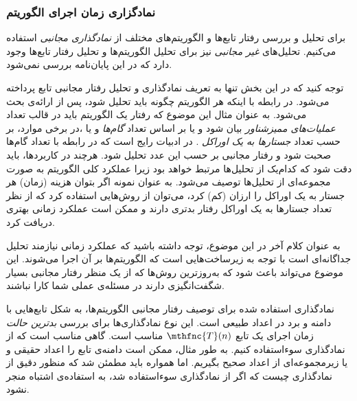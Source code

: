 
% 
%
%
%
%
%
%
%
%
%
%
%

\subsubsection{
نمادگزاری زمان اجرای الگوریتم
\cite{clrs2009}
}
برای تحلیل و بررسی رفتار تابع‌ها و الگوریتم‌های مختلف از
\textit{
نمادگذاری مجانبی
} 
استفاده می‌کنیم. تحلیل‌های 
\textit{
غیر مجانبی
} 
نیز برای تحلیل الگوریتم‌ها و تحلیل رفتار تابع‌ها وجود دارد که در این پایان‌نامه بررسی نمی‌شود.


توجه کنید که در این بخش تنها به تعریف نمادگذاری و تحلیل رفتار مجانبی تابع پرداخته می‌شود. در رابطه با اینکه هر الگوریتم چگونه باید تحلیل شود، پس از ارائه‌ی بحث می‌شود. به عنوان مثال این موضوع که رفتار یک الگوریتم باید در قالب تعداد 
\textit{
عملیات‌های ممیزشناور
} 
بیان شود و یا بر اساس تعداد 
\textit{
گام‌ها
} 
و یا ،در برخی موارد، بر حسب تعداد
\textit{
جستارها به یک اوراکل
}. 
در ادبیات رایج است که در رابطه با تعداد گام‌ها صحبت شود و رفتار مجانبی بر حسب این عدد تحلیل شود. هرچند در کاربردها، باید دقت شود که کدام‌یک از تحلیل‌ها مرتبط خواهد بود زیرا عملکرد کلی الگوریتم به صورت مجموعه‌ای از تحلیل‌ها توصیف می‌شود. به عنوان نمونه اگر بتوان هزینه (زمان) هر جستار به یک اوراکل را ارزان (کم) کرد، می‌توان از روش‌هایی استفاده کرد که از نظر تعداد جستارها به یک اوراکل رفتار بدتری دارند و ممکن است عملکرد زمانی بهتری دریافت کرد.


به عنوان کلام آخر در این موضوع، توجه داشته باشید که عملکرد زمانی نیازمند تحلیل جداگانه‌ای است با توجه به زیرساخت‌هایی است که الگوریتم‌ها بر آن اجرا می‌شوند. این موضوع می‌تواند باعث شود که به‌روزترین روش‌ها که از یک منظر رفتار مجانبی بسیار شگفت‌انگیزی دارند در مسئله‌ی عملی شما کارا نباشند.


نمادگذاری استفاده شده برای توصیف رفتار مجانبی الگوریتم‌ها، به شکل تابع‌هایی با دامنه و برد در اعداد طبیعی است. این نوع نمادگذاری‌ها برای بررسی 
\textit{
بدترین حالت
} 
زمان اجرای یک تابع 
$\mthfnc{T}(n)$ 
مناسب است. گاهی مناسب است که از نمادگذاری سوءاستفاده کنیم. به طور مثال، ممکن است دامنه‌ی تابع را اعداد حقیقی و یا زیرمجموعه‌ای از اعداد صحیح بگیریم. اما همواره باید مطمئن شد که منظور دقیق از نمادگذاری چیست که اگر از نمادگذاری سوءاستفاده شد، به استفاده‌ی اشتباه منجر نشود.

